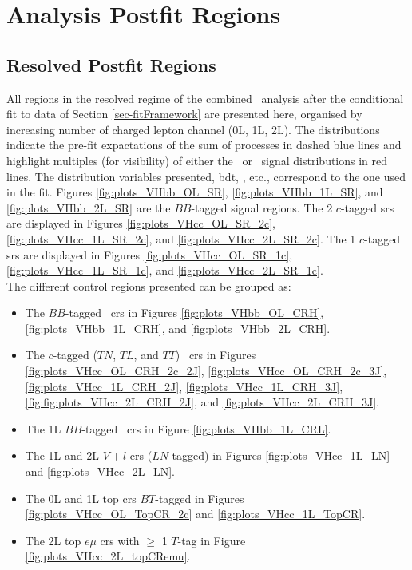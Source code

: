 \section{Analysis Postfit Regions}\label{appsec-vh-analRegPosfit}
\subsection{Resolved Postfit Regions}\label{appsec-vh-analRegResPosfit}
All regions in the resolved regime of the combined \vhbc\ analysis after the conditional fit to data of Section \ref{sec-fitFramework} are presented here, organised by increasing number of charged lepton channel (0L, 1L, 2L). The distributions indicate the pre-fit expactations of the sum of processes in dashed blue lines and highlight multiples (for visibility) of either the \vhb\ or \vhc\ signal distributions in red lines. The distribution variables presented, \gls{bdt}, \ptv, etc., correspond to the one used in the fit. Figures \ref{fig:plots_VHbb_OL_SR}, \ref{fig:plots_VHbb_1L_SR}, and \ref{fig:plots_VHbb_2L_SR} are the $BB$-tagged signal regions. The 2 $c$-tagged \glspl{sr} are displayed in Figures \ref{fig:plots_VHcc_OL_SR_2c}, \ref{fig:plots_VHcc_1L_SR_2c}, and \ref{fig:plots_VHcc_2L_SR_2c}. The 1 $c$-tagged \glspl{sr} are displayed in Figures \ref{fig:plots_VHcc_OL_SR_1c}, \ref{fig:plots_VHcc_1L_SR_1c}, and \ref{fig:plots_VHcc_2L_SR_1c}. \\

The different control regions presented can be grouped as:
\begin{itemize}
  \item The $BB$-tagged \highdr\ \glspl{cr} in Figures \ref{fig:plots_VHbb_OL_CRH}, \ref{fig:plots_VHbb_1L_CRH}, and \ref{fig:plots_VHbb_2L_CRH}.
  \item The $c$-tagged ($TN$, $TL$, and $TT$) \highdr\ \glspl{cr} in Figures \ref{fig:plots_VHcc_OL_CRH_2c_2J}, \ref{fig:plots_VHcc_OL_CRH_2c_3J}, \ref{fig:plots_VHcc_1L_CRH_2J}, \ref{fig:plots_VHcc_1L_CRH_3J}, \ref{fig:fig:plots_VHcc_2L_CRH_2J}, and \ref{fig:plots_VHcc_2L_CRH_3J}.
  \item The 1L $BB$-tagged \lowdr\ \glspl{cr} in Figure \ref{fig:plots_VHbb_1L_CRL}.
  \item The 1L and 2L $V+l$ \glspl{cr} ($LN$-tagged) in Figures \ref{fig:plots_VHcc_1L_LN} and \ref{fig:plots_VHcc_2L_LN}.
  \item The 0L and 1L top \glspl{cr} $BT$-tagged in Figures \ref{fig:plots_VHcc_OL_TopCR_2c} and \ref{fig:plots_VHcc_1L_TopCR}.
  \item The 2L top $e\mu$ \glspl{cr} with $\geq$ 1 $T$-tag in Figure \ref{fig:plots_VHcc_2L_topCRemu}.
\end{itemize}
  
